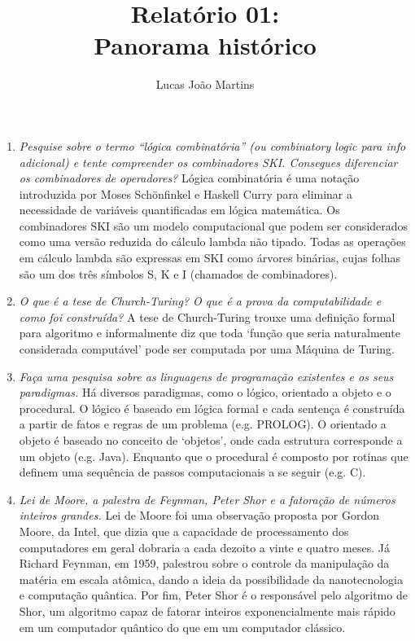 \documentclass[12pt]{article}
\title{Relatório 01: \\ Panorama histórico}
\author{Lucas João Martins}
\date{}
\begin{document}
\maketitle

\section*{}

\begin{enumerate}
\item \textit{Pesquise sobre o termo ``lógica combinatória'' (ou combinatory
logic para info adicional) e tente compreender os combinadores SKI. Consegues
diferenciar os combinadores de operadores?} Lógica combinatória é uma notação
introduzida por Moses Schönfinkel e Haskell Curry para eliminar a necessidade de
variáveis quantificadas em lógica matemática. Os combinadores SKI são um modelo
computacional que podem ser considerados como uma versão reduzida do cálculo
lambda não tipado. Todas as operações em cálculo lambda são expressas em SKI
como árvores binárias, cujas folhas são um dos três símbolos S, K e I (chamados
de combinadores).

\item \textit{O que é a tese de Church-Turing? O que é a prova da
computabilidade e como foi construída?} A tese de Church-Turing trouxe uma
definição formal para algoritmo e informalmente diz que toda `função que seria
naturalmente considerada computável' pode ser computada por uma Máquina de
Turing.

\item \textit{Faça uma pesquisa sobre as linguagens de programação existentes e
os seus paradigmas.} Há diversos paradigmas, como o lógico, orientado a objeto e
o procedural. O lógico é baseado em lógica formal e cada sentença é construída a
partir de fatos e regras de um problema (e.g. PROLOG). O orientado a objeto é
baseado no conceito de `objetos', onde cada estrutura corresponde a um objeto
(e.g. Java). Enquanto que o procedural é composto por rotinas que definem uma
sequência de passos computacionais a se seguir (e.g. C).

\item \textit{Lei de Moore, a palestra de Feynman, Peter Shor e a fatoração de
números inteiros grandes.} Lei de Moore foi uma observação proposta por Gordon
Moore, da Intel, que dizia que a capacidade de processamento dos computadores em
geral dobraria a cada dezoito a vinte e quatro meses. Já Richard Feynman, em
1959, palestrou sobre o controle da manipulação da matéria em escala atômica,
dando a ideia da possibilidade da nanotecnologia e computação quântica. Por fim,
Peter Shor é o responsável pelo algoritmo de Shor, um algoritmo capaz de fatorar
inteiros exponencialmente mais rápido em um computador quântico do que em um
computador clássico.


\end{enumerate}
\end{document}
